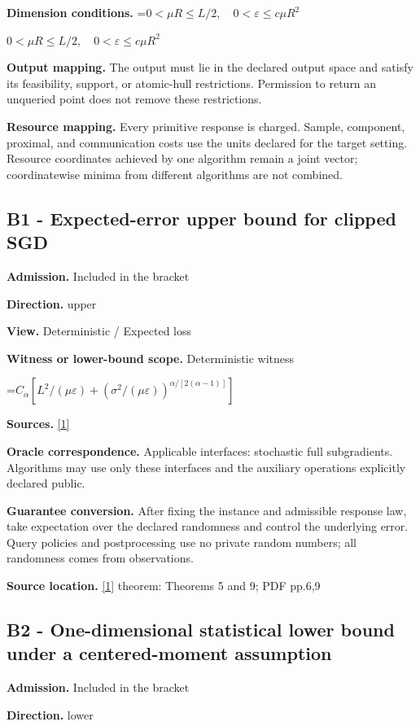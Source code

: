 \documentclass[10pt,a4paper]{article}
\newcommand{\AtlasMath}[1]{\par\begingroup\centering\setbox0=\hbox{$\displaystyle #1$}\ifdim\wd0>1.4\linewidth\typeout{ATLAS WIDE FORMULA: \the\wd0}\fi\ifdim\wd0>\linewidth\resizebox{\linewidth}{!}{\box0}\else\box0\fi\par\endgroup}
\newcommand{\AtlasInlineMath}[1]{\begingroup\setbox0=\hbox{$#1$}\ifdim\wd0>.4\linewidth\endgroup\AtlasMath{#1}\else\endgroup$#1$\fi}
\begin{document}
\textbf{Dimension conditions.} \AtlasInlineMath{0<\mu R\le L/2,\quad0<\varepsilon\le c\mu R^2}

\textbf{Output mapping.} The output must lie in the declared output space and satisfy its feasibility, support, or atomic-hull restrictions. Permission to return an unqueried point does not remove these restrictions.

\textbf{Resource mapping.} Every primitive response is charged. Sample, component, proximal, and communication costs use the units declared for the target setting. Resource coordinates achieved by one algorithm remain a joint vector; coordinatewise minima from different algorithms are not combined.

\subsection{B1 - Expected-error upper bound for clipped SGD}
\textbf{Admission.} Included in the bracket

\textbf{Direction.} upper

\textbf{View.} Deterministic / Expected loss

\textbf{Witness or lower-bound scope.} Deterministic witness

\AtlasMath{C_\alpha[L^2/(\mu\varepsilon)+(\sigma^2/(\mu\varepsilon))^{\alpha/[2(\alpha-1)]}]}
\textbf{Sources.} \href{https://arxiv.org/pdf/2303.12277}{[1]}

\textbf{Oracle correspondence.} Applicable interfaces: stochastic full subgradients. Algorithms may use only these interfaces and the auxiliary operations explicitly declared public.

\textbf{Guarantee conversion.} After fixing the instance and admissible response law, take expectation over the declared randomness and control the underlying error. Query policies and postprocessing use no private random numbers; all randomness comes from observations.

\textbf{Source location.} \href{https://arxiv.org/pdf/2303.12277}{[1]} theorem: Theorems 5 and 9; PDF pp.6,9

\subsection{B2 - One-dimensional statistical lower bound under a centered-moment assumption}
\textbf{Admission.} Included in the bracket

\textbf{Direction.} lower
\end{document}
